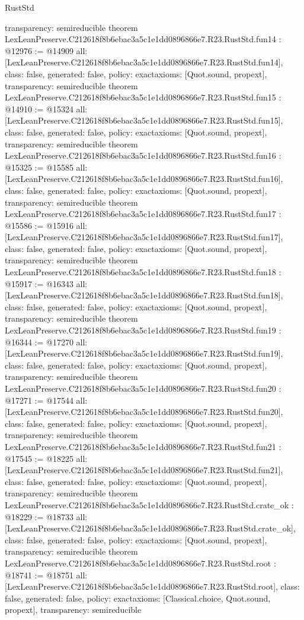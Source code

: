 \begin{lexlean}{RustStd}
\begin{coremodule}
{  transparency: semireducible
}
theorem LexLeanPreserve.C212618f8b6ebac3a5c1e1dd0896866e7.R23.RustStd.fun14 : @12976 := @14909 {
  all: [LexLeanPreserve.C212618f8b6ebac3a5c1e1dd0896866e7.R23.RustStd.fun14],
  class: false,
  generated: false,
  policy: exact{axioms: [Quot.sound, propext]},
  transparency: semireducible
}
theorem LexLeanPreserve.C212618f8b6ebac3a5c1e1dd0896866e7.R23.RustStd.fun15 : @14910 := @15324 {
  all: [LexLeanPreserve.C212618f8b6ebac3a5c1e1dd0896866e7.R23.RustStd.fun15],
  class: false,
  generated: false,
  policy: exact{axioms: [Quot.sound, propext]},
  transparency: semireducible
}
theorem LexLeanPreserve.C212618f8b6ebac3a5c1e1dd0896866e7.R23.RustStd.fun16 : @15325 := @15585 {
  all: [LexLeanPreserve.C212618f8b6ebac3a5c1e1dd0896866e7.R23.RustStd.fun16],
  class: false,
  generated: false,
  policy: exact{axioms: [Quot.sound, propext]},
  transparency: semireducible
}
theorem LexLeanPreserve.C212618f8b6ebac3a5c1e1dd0896866e7.R23.RustStd.fun17 : @15586 := @15916 {
  all: [LexLeanPreserve.C212618f8b6ebac3a5c1e1dd0896866e7.R23.RustStd.fun17],
  class: false,
  generated: false,
  policy: exact{axioms: [Quot.sound, propext]},
  transparency: semireducible
}
theorem LexLeanPreserve.C212618f8b6ebac3a5c1e1dd0896866e7.R23.RustStd.fun18 : @15917 := @16343 {
  all: [LexLeanPreserve.C212618f8b6ebac3a5c1e1dd0896866e7.R23.RustStd.fun18],
  class: false,
  generated: false,
  policy: exact{axioms: [Quot.sound, propext]},
  transparency: semireducible
}
theorem LexLeanPreserve.C212618f8b6ebac3a5c1e1dd0896866e7.R23.RustStd.fun19 : @16344 := @17270 {
  all: [LexLeanPreserve.C212618f8b6ebac3a5c1e1dd0896866e7.R23.RustStd.fun19],
  class: false,
  generated: false,
  policy: exact{axioms: [Quot.sound, propext]},
  transparency: semireducible
}
theorem LexLeanPreserve.C212618f8b6ebac3a5c1e1dd0896866e7.R23.RustStd.fun20 : @17271 := @17544 {
  all: [LexLeanPreserve.C212618f8b6ebac3a5c1e1dd0896866e7.R23.RustStd.fun20],
  class: false,
  generated: false,
  policy: exact{axioms: [Quot.sound, propext]},
  transparency: semireducible
}
theorem LexLeanPreserve.C212618f8b6ebac3a5c1e1dd0896866e7.R23.RustStd.fun21 : @17545 := @18225 {
  all: [LexLeanPreserve.C212618f8b6ebac3a5c1e1dd0896866e7.R23.RustStd.fun21],
  class: false,
  generated: false,
  policy: exact{axioms: [Quot.sound, propext]},
  transparency: semireducible
}
theorem LexLeanPreserve.C212618f8b6ebac3a5c1e1dd0896866e7.R23.RustStd.crate_ok : @18229 := @18733 {
  all: [LexLeanPreserve.C212618f8b6ebac3a5c1e1dd0896866e7.R23.RustStd.crate_ok],
  class: false,
  generated: false,
  policy: exact{axioms: [Quot.sound, propext]},
  transparency: semireducible
}
theorem LexLeanPreserve.C212618f8b6ebac3a5c1e1dd0896866e7.R23.RustStd.root : @18741 := @18751 {
  all: [LexLeanPreserve.C212618f8b6ebac3a5c1e1dd0896866e7.R23.RustStd.root],
  class: false,
  generated: false,
  policy: exact{axioms: [Classical.choice, Quot.sound, propext]},
  transparency: semireducible
}


\end{coremodule}
\end{lexlean}
